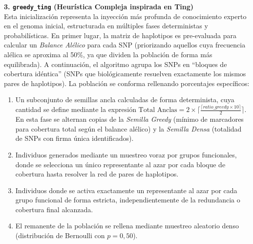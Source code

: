 \documentclass[a4paper,10pt]{article}
\begin{document}
\textbf{3. \texttt{greedy\_ting} (Heurística Compleja inspirada en Ting)} \\
Esta inicialización representa la inyección más profunda de conocimiento experto en el genoma inicial, estructurada en múltiples fases deterministas y probabilísticas. En primer lugar, la matriz de haplotipos es pre-evaluada para calcular un \textit{Balance Alélico} para cada SNP (priorizando aquellos cuya frecuencia alélica se aproxima al 50\%, ya que dividen la población de forma más equilibrada). A continuación, el algoritmo agrupa los SNPs en ``bloques de cobertura idéntica'' (SNPs que biológicamente resuelven exactamente los mismos pares de haplotipos). 
La población se conforma rellenando porcentajes específicos:
\begin{enumerate}
    \item Un subconjunto de semillas ancla calculadas de forma determinista, cuya cantidad se define mediante la expresión $\text{Total Anclas} = 2 \times \lceil \frac{\lceil ratio\_greedy \times 10 \rceil}{2} \rceil$. En esta fase se alternan copias de la \textit{Semilla Greedy} (mínimo de marcadores para cobertura total según el balance alélico) y la \textit{Semilla Densa} (totalidad de SNPs con firma única identificados).
    \item Individuos generados mediante un muestreo voraz por grupos funcionales, donde se selecciona un único representante al azar por cada bloque de cobertura hasta resolver la red de pares de haplotipos.
    \item Individuos donde se activa exactamente un representante al azar por cada grupo funcional de forma estricta, independientemente de la redundancia o cobertura final alcanzada.
    \item El remanente de la población se rellena mediante muestreo aleatorio denso (distribución de Bernoulli con $p=0,50$).
\end{enumerate}
\end{document}
